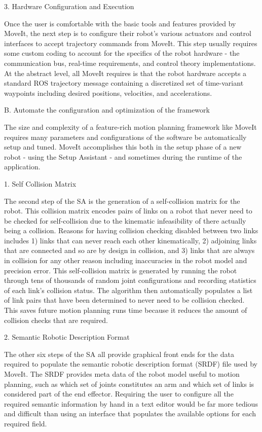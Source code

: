 \documentclass[10pt,journal,compsoc]{joser1}
\begin{document}
{3. Hardware Configuration and Execution

Once the user is comfortable with the basic tools and features provided by MoveIt, the next step is to configure their robot's various actuators and control interfaces to accept trajectory commands from MoveIt. This step usually requires some custom coding to account for the specifics of the robot hardware - the communication bus, real-time requirements, and control theory implementations. At the abstract level, all MoveIt requires is that the robot hardware accepts a standard ROS trajectory message containing a discretized set of time-variant waypoints including desired positions, velocities, and accelerations. 

B. Automate the configuration and optimization of the framework

The size and complexity of a feature-rich motion planning framework like MoveIt requires many parameters and configurations of the software be automatically setup and tuned. MoveIt accomplishes this both in the setup phase of a new robot - using the Setup Assistant - and sometimes during the runtime of the application.

1. Self Collision Matrix

The second step of the SA is the generation of a self-collision matrix for the robot. This collision matrix encodes pairs of links on a robot that never need to be checked for self-collision due to the kinematic infeasibility of there actually being a collision. Reasons for having collision checking disabled between two links includes 1) links that can never reach each other kinematically, 2) adjoining links that are connected and so are by design in collision, and 3) links that are always in collision for any other reason including inaccuracies in the robot model and precision error. This self-collision matrix is generated by running the robot through tens of thousands of random joint configurations and recording statistics of each link's collision status. The algorithm then automatically populates a list of link pairs that have been determined to never need to be collision checked. This saves future motion planning runs time because it reduces the amount of collision checks that are required.

2. Semantic Robotic Description Format

The other six steps of the SA all provide graphical front ends for the data required to populate the semantic robotic description format (SRDF) file used by MoveIt. The SRDF provides meta data of the robot model useful to motion planning, such as which set of joints constitutes an arm and which set of links is considered part of the end effector. Requiring the user to configure all the required semantic information by hand in a text editor would be far more tedious and difficult than using an interface that populates the available options for each required field.

}
\end{document}
